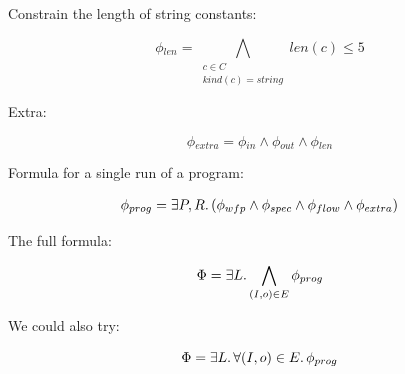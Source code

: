 Constrain the length of string constants:

\[
  \phi{}_{len} = \bigwedge_{\substack{c \in C \\ kind(c) = string}} len(c) \leq 5
\]

Extra:

\[ \phi{}_{extra} = \phi{}_{in} \wedge \phi{}_{out} \wedge \phi{}_{len} \]

Formula for a single run of a program:

\begin{align*}
  \phi{}_{prog} = \exists P,R\ldotp (\phi{}_{wfp} \wedge \phi{}_{spec} \wedge
  \phi{}_{flow} \wedge \phi{}_{extra})
\end{align*}

The full formula:

\[
  \Phi{} = \exists L\ldotp \bigwedge_{(I, o) \in E}\phi{}_{prog}
\]

We could also try:

\[
  \Phi{} = \exists L\ldotp \forall (I, o) \in E \ldotp \phi{}_{prog}
\]



